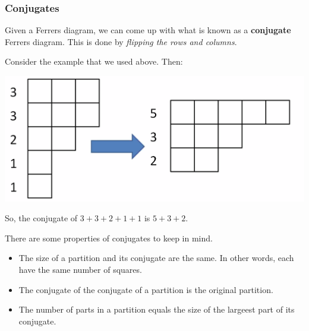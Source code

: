 \documentclass[letterpaper]{article}
\begin{document}
\subsubsection{Conjugates}
Given a Ferrers diagram, we can come up with what is known as a \textbf{conjugate} Ferrers diagram. This is done by \emph{flipping the rows and columns}.

\bigskip 

Consider the example that we used above. Then:
\begin{center}
    \includegraphics[scale=0.3]{img/conj.PNG}
\end{center}
So, the conjugate of $3 + 3 + 2 + 1 + 1$ is $5 + 3 + 2$. 

\bigskip 

There are some properties of conjugates to keep in mind.
\begin{itemize}
    \item The size of a partition and its conjugate are the same. In other words, each have the same number of squares.
    \item The conjugate of the conjugate of a partition is the original partition.
    \item The number of parts in a partition equals the size of the largeest part of its conjugate.
\end{itemize}
\end{document}
